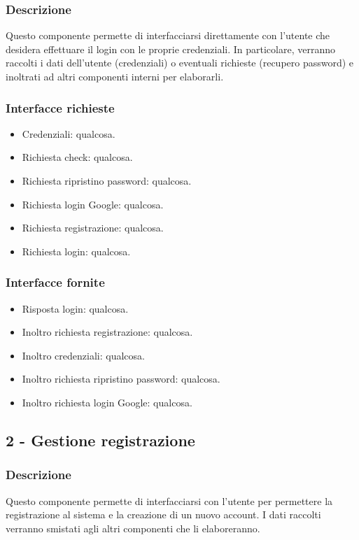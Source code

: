 \documentclass[a4paper,12pt]{article}
\begin{document}
\subsubsection*{Descrizione}
Questo componente permette di interfacciarsi direttamente con l’utente che desidera effettuare il login con le proprie credenziali. In particolare, verranno raccolti i dati dell’utente (credenziali) o eventuali richieste (recupero password) e inoltrati ad altri componenti interni per elaborarli.

\subsubsection*{Interfacce richieste}
\begin{itemize} \setlength\itemsep{0.01em}
\item {\sffamily Credenziali}: qualcosa.
\item {\sffamily Richiesta check}: qualcosa.
\item {\sffamily Richiesta ripristino password}: qualcosa.
\item {\sffamily Richiesta login Google}: qualcosa.
\item {\sffamily Richiesta registrazione}: qualcosa.
\item {\sffamily Richiesta login}: qualcosa.
\end{itemize}

\subsubsection*{Interfacce fornite}
\begin{itemize} \setlength\itemsep{0.01em}
\item {\sffamily Risposta login}: qualcosa.
\item {\sffamily Inoltro richiesta registrazione}: qualcosa.
\item {\sffamily Inoltro credenziali}: qualcosa.
\item {\sffamily Inoltro richiesta ripristino password}: qualcosa.
\item {\sffamily Inoltro richiesta login Google}: qualcosa.
\end{itemize}





\subsection*{2 - Gestione registrazione}
\subsubsection*{Descrizione}
Questo componente permette di interfacciarsi con l’utente per permettere la registrazione al sistema e la creazione di un nuovo account. I dati raccolti verranno smistati agli altri componenti che li elaboreranno.
\end{document}
